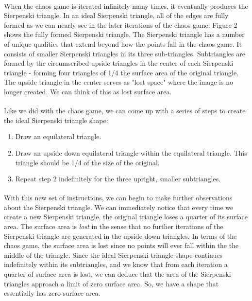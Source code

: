 \documentclass{article}
\begin{document}
\paragraph{}
When the chaos game is iterated infinitely many times, it eventually produces the Sierpenski triangle. In an ideal Sierpenski triangle, all of the edges are fully formed as we can nearly see in the later iterations of the chaos game. Figure 2 shows the fully formed Sierpenski triangle. The Sierpenski triangle has a number of unique qualities that extend beyond how the points fall in the chaos game. It consists of smaller Sierpenski triangles in its three sub-triangles. Subtriangles are formed by the circumscribed upside triangles in the center of each Sierpenski triangle - forming four triangles of 1/4 the surface area of the original triangle. The upside triangle in the center serves as "lost space" where the image is no longer created. We can think of this as lost surface area.
\paragraph{}
Like we did with the chaos game, we can come up with a series of steps to create the ideal Sierpenski triangle shape:
\begin{enumerate}
    \item Draw an equilateral triangle.
    \item Draw an upside down equilateral triangle within the equilateral triangle. This triangle should be 1/4 of the size of the original.
    \item Repeat step 2 indefinitely for the three upright, smaller subtriangles.
\end{enumerate}
\paragraph{}
With this new set of instructions, we can begin to make further observations about the Sierpenski triangle. We can immediately notice that every time we create a new Sierpenski triangle, the original triangle loses a quarter of its surface area. The surface area is \textit{lost} in the sense that no further iterations of the Sierpenski triangle are generated in the upside down triangles. In terms of the chaos game, the surface area is lost since no points will ever fall within the the middle of the triangle. Since the ideal Sierpenski triangle shape continues indefinitely within its subtriangles, and we know that from each iteration a quarter of surface area is lost, we can deduce that the area of the Sierpenski triangles approach a limit of zero surface area. So, we have a shape that essentially has zero surface area.
\end{document}
